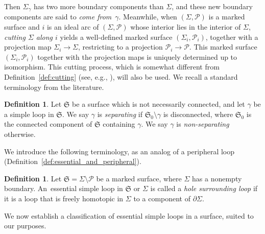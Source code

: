 \documentclass[10pt,a4paper]{amsart}
\numberwithin{equation}{section}
\theoremstyle{definition}
\newtheorem{Definition}[Theorem]{Definition}
\begin{document}
Then $\Sigma_\gamma$ has two more boundary components than $\Sigma$, and these new boundary components are said to {\em come from}~$\gamma$.
Meanwhile, when $(\Sigma,\mathcal{P})$ is a marked surface and $i$ is an ideal arc of $(\Sigma,\mathcal{P})$ whose interior lies in the interior of $\Sigma$, {\em cutting $\Sigma$ along $i$} yields a well-defined marked surface $(\Sigma_i,\mathcal{P}_i)$, together with a projection map $\Sigma_i \to \Sigma$, restricting to a projection $\mathcal{P}_i \to \mathcal{P}$. This marked surface $(\Sigma_i,\mathcal{P}_i)$ together with the projection maps is uniquely determined up to isomorphism. This cutting process, which is somewhat different from Definition~\ref{def:cutting} (see, e.g., \cite[Definition and Lemma~3.12]{KLS}), will also be used.
We recall a standard terminology from the literature.
\begin{Definition}
Let $\mathfrak{S}$ be a surface which is not necessarily connected, and let $\gamma$ be a simple loop in $\mathfrak{S}$. We say $\gamma$ is {\em separating} if $\mathfrak{S}_0 \setminus\gamma$ is disconnected, where $\mathfrak{S}_0$ is the connected component of $\mathfrak{S}$ containing $\gamma$. We say $\gamma$ is {\em non-separating} otherwise.
\end{Definition}
We introduce the following terminology, as an analog of a peripheral loop (Definition~\ref{def:essential_and_peripheral}).
\begin{Definition}
\label{def:hole-surrounding}
Let $\mathfrak{S} = \Sigma\setminus\mathcal{P}$ be a marked surface, where $\Sigma$ has a nonempty boundary. An~essential simple loop in $\mathfrak{S}$ or $\Sigma$ is called a {\em hole surrounding loop} if it is a loop that is freely homotopic in $\Sigma$ to a component of $\partial \Sigma$.
\end{Definition}
We now establish a classification of essential simple loops in a surface, suited to our purposes.
\end{document}
